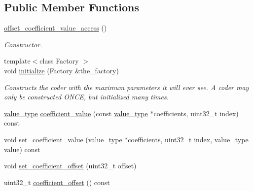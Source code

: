 \subsection*{Public Member Functions}
\begin{DoxyCompactItemize}
\item 
\hypertarget{classkodo_1_1offset__coefficient__value__access_ad9ce9dea9fab3f01d870e7a49ef1a084}{\hyperlink{classkodo_1_1offset__coefficient__value__access_ad9ce9dea9fab3f01d870e7a49ef1a084}{offset\-\_\-coefficient\-\_\-value\-\_\-access} ()}\label{classkodo_1_1offset__coefficient__value__access_ad9ce9dea9fab3f01d870e7a49ef1a084}

\begin{DoxyCompactList}\small\item\em Constructor. \end{DoxyCompactList}\item 
{\footnotesize template$<$class Factory $>$ }\\void \hyperlink{classkodo_1_1offset__coefficient__value__access_af8296bff7302435fc7468c499ed9c516}{initialize} (Factory \&the\-\_\-factory)
\begin{DoxyCompactList}\small\item\em Constructs the coder with the maximum parameters it will ever see. A coder may only be constructed O\-N\-C\-E, but initialized many times. \end{DoxyCompactList}\item 
\hyperlink{classkodo_1_1coefficient__value__access_a629750d630f4188d48eb49f76cf750f1}{value\-\_\-type} \hyperlink{classkodo_1_1offset__coefficient__value__access_a058c1d828ae5abcc8c5395e41ac97b09}{coefficient\-\_\-value} (const \hyperlink{classkodo_1_1coefficient__value__access_a629750d630f4188d48eb49f76cf750f1}{value\-\_\-type} $\ast$coefficients, uint32\-\_\-t index) const 
\begin{DoxyCompactList}\small\item\em \end{DoxyCompactList}\item 
void \hyperlink{classkodo_1_1offset__coefficient__value__access_ad36f50a55c03fe158d2f769437b2aedf}{set\-\_\-coefficient\-\_\-value} (\hyperlink{classkodo_1_1coefficient__value__access_a629750d630f4188d48eb49f76cf750f1}{value\-\_\-type} $\ast$coefficients, uint32\-\_\-t index, \hyperlink{classkodo_1_1coefficient__value__access_a629750d630f4188d48eb49f76cf750f1}{value\-\_\-type} value) const 
\begin{DoxyCompactList}\small\item\em \end{DoxyCompactList}\item 
void \hyperlink{classkodo_1_1offset__coefficient__value__access_a13bc790d10f25379367c681a4da9eab6}{set\-\_\-coefficient\-\_\-offset} (uint32\-\_\-t offset)
\item 
uint32\-\_\-t \hyperlink{classkodo_1_1offset__coefficient__value__access_a7927ceed944b99334083b00afccba7bc}{coefficient\-\_\-offset} () const 
\end{DoxyCompactItemize}


